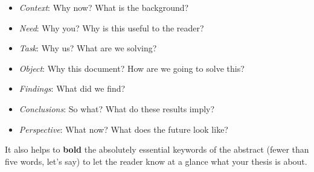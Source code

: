 \begin{itemize}
	\item \emph{Context}: Why now? What is the background?
	\item \emph{Need}: Why you? Why is this useful to the reader?
	\item \emph{Task}: Why us? What are we solving?
	\item \emph{Object}: Why this document? How are we going to solve this?

	\item \emph{Findings}: What did we find?
	\item \emph{Conclusions}: So what? What do these results imply?
	\item \emph{Perspective}: What now? What does the future look like?
\end{itemize}

It also helps to \textbf{bold} the absolutely essential keywords of the abstract (fewer than five words, let's say) to let the reader know at a glance what your thesis is about.


\makebox[\linewidth]{\resizebox{0.9\linewidth}{1pt}{$\bullet$}}\bigskip